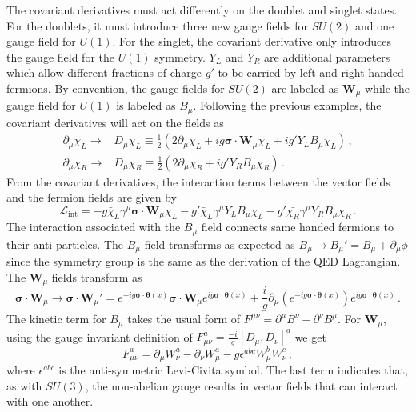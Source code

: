 The covariant derivatives must act differently on the doublet and singlet states. For the doublets, it must introduce three new gauge fields for $SU(2)$ and one gauge field for $U(1)$. For the singlet, the covariant derivative only introduces the gauge field for the $U(1)$ symmetry. $Y_L$ and $Y_R$ are additional parameters which allow different fractions of charge $g'$ to be carried by left and right handed fermions. By convention, the gauge fields for $SU(2)$ are labeled as $\mathbf{W}_\mu$ while the gauge field for $U(1)$ is labeled as $B_\mu$. Following the previous examples, the covariant derivatives will act on the fields as
\begin{align}
	\label{eq:ew_cov_derivative}
	\partial_\mu\chi_L\to&D_\mu\chi_L\equiv\frac{1}{2}\left(2\partial_\mu\chi_L+ig\boldsymbol{\sigma}\cdot\mathbf{W}_\mu\chi_L+ig'Y_{L}B_\mu\chi_L\right)\,,\\
	\partial_\mu\chi_R\to&D_\mu\chi_R\equiv\frac{1}{2}\left(2\partial_\mu\chi_R+ig'Y_{R}B_\mu\chi_R\right)\,.
\end{align}
From the covariant derivatives, the interaction terms between the vector fields and the fermion fields are given by
\begin{equation}
	\label{eq:ew_interaction}
	\mathcal{L}_\text{int}=-g\bar{\chi}_L\gamma^\mu\boldsymbol{\sigma}\cdot\mathbf{W}_\mu\chi_L-g'\bar{\chi}_L\gamma^\mu Y_{L}B_\mu\chi_L-g'\bar{\chi_R}\gamma^\mu Y_{R} B_\mu\chi_R\,.
\end{equation}
The interaction associated with the $B_\mu$ field connects same handed fermions to their anti-particles. The $B_\mu$ field transforms as expected as $B_\mu\to B_\mu'=B_\mu+\partial_\mu\phi$ since the symmetry group is the same as the derivation of the QED Lagrangian. The $\mathbf{W}_\mu$ fields transform as
\begin{equation}
	\boldsymbol{\sigma}\cdot\mathbf{W}_\mu\to\boldsymbol{\sigma}\cdot\mathbf{W}_\mu'=e^{-ig\boldsymbol{\sigma}\cdot\boldsymbol{\theta}(x)}\boldsymbol{\sigma}\cdot\mathbf{W}_\mu e^{ig\boldsymbol{\sigma}\cdot\boldsymbol{\theta}(x)}+\frac{i}{g}\partial_\mu\left(e^{-ig\boldsymbol{\sigma}\cdot\boldsymbol{\theta}(x)}\right)e^{ig\boldsymbol{\sigma}\cdot\boldsymbol{\theta}(x)}\,.
\end{equation}
The kinetic term for $B_\mu$ takes the usual form of $F^{\mu\nu}=\partial^\mu B^\nu-\partial^\nu B^\mu$. For $\mathbf{W}_\mu$, using the gauge invariant definition of $F^{a}_{\mu\nu}=\frac{-i}{g}[D_\mu,D_\nu]^a$ we get
\begin{equation}
	F^{a}_{\mu\nu}=\partial_\mu W_\nu^a-\partial_\nu W_\mu^a-g\epsilon^{abc}W_\mu^bW_\nu^c\,,
\end{equation}
where $\epsilon^{abc}$ is the anti-symmetric Levi-Civita symbol. The last term indicates that, as with $SU(3)$, the non-abelian gauge results in vector fields that can interact with one another.

